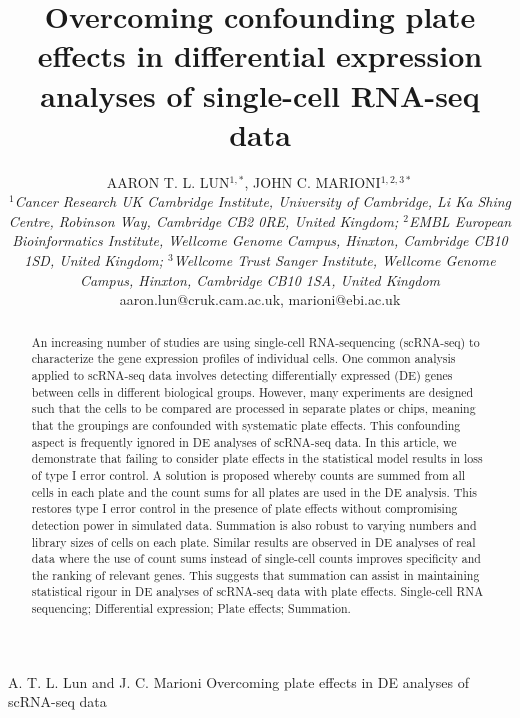 \documentclass[oupdraft]{bio}
\begin{document}
\title{Overcoming confounding plate effects in differential expression analyses of single-cell RNA-seq data}

\author{AARON T. L. LUN$^{1,\ast}$, JOHN C. MARIONI$^{1,2,3\ast}$ \\[4pt]
    \textit{$^1$Cancer Research UK Cambridge Institute, University of Cambridge, Li Ka Shing Centre, Robinson Way, Cambridge CB2 0RE, United Kingdom;
$^2$EMBL European Bioinformatics Institute, Wellcome Genome Campus, Hinxton, Cambridge CB10 1SD, United Kingdom;
$^3$Wellcome Trust Sanger Institute, Wellcome Genome Campus, Hinxton, Cambridge CB10 1SA, United Kingdom}
    \\[2pt]
{aaron.lun@cruk.cam.ac.uk, marioni@ebi.ac.uk}}

\markboth%
{A. T. L. Lun and J. C. Marioni}
{Overcoming plate effects in DE analyses of scRNA-seq data}

\maketitle


\newcommand\revised[1]{#1}%

\begin{abstract}{
An increasing number of studies are using single-cell RNA-sequencing (scRNA-seq) to characterize the gene expression profiles of individual cells.
One common analysis applied to scRNA-seq data involves detecting differentially expressed (DE) genes between cells in different biological groups.
However, many experiments are designed such that the cells to be compared are processed in separate plates or chips, 
    meaning that the groupings are confounded with systematic plate effects.
This confounding aspect is frequently ignored in DE analyses of scRNA-seq data.
In this article, we demonstrate that failing to consider plate effects in the statistical model results in loss of type I error control.
A solution is proposed whereby counts are summed from all cells in each plate and the count sums for all plates are used in the DE analysis.
This restores type I error control in the presence of plate effects without compromising detection power in simulated data.
Summation is also robust to varying numbers and library sizes of cells on each plate.
Similar results are observed in DE analyses of real data where the use of count sums instead of single-cell counts \revised{improves specificity and the ranking of relevant genes}.
This suggests that summation can assist in maintaining statistical rigour in DE analyses of scRNA-seq data with plate effects.
}
{Single-cell RNA sequencing; Differential expression; Plate effects; Summation.}
\end{abstract}
\end{document}
